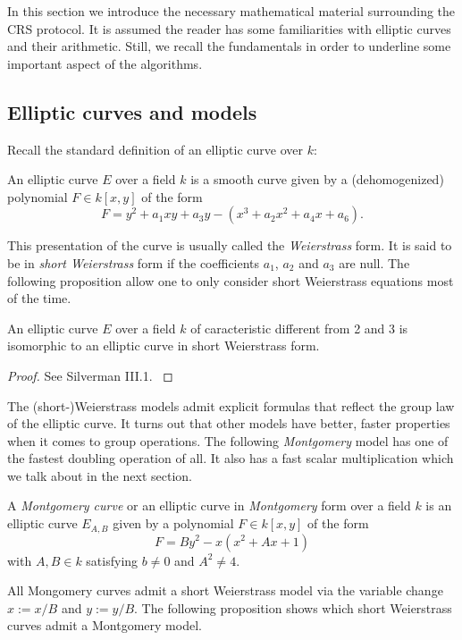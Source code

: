\documentclass[../main/main.tex]{subfiles}
\begin{document}
In this section we introduce the necessary mathematical material surrounding the CRS protocol.
It is assumed the reader has some familiarities with elliptic curves and their arithmetic.
Still, we recall the fundamentals in order to underline some important aspect of the algorithms.


\subsection{Elliptic curves and models}
Recall the standard definition of an elliptic curve over $k$:
\begin{definition}
	An elliptic curve $E$ over a field $k$ is a smooth curve given by a (dehomogenized) polynomial $F\in k[x,y]$ of the form
	\[
		F = y^2 + a_1xy + a_3y - (x^3 +a_2 x^2 + a_4 x + a_6).
	\]
\end{definition}
This presentation of the curve is usually called the \textit{Weierstrass} form.
It is said to be in \textit{short Weierstrass} form if the coefficients $a_1$, $a_2$ and $a_3$ are null.
The following proposition allow one to only consider short Weierstrass equations most of the time.
\begin{proposition}
	An elliptic curve $E$ over a field $k$ of caracteristic different from 2 and 3 is isomorphic to an elliptic curve in short Weierstrass form.
\end{proposition}
\begin{proof}
	See Silverman III.1. \cite{}
\end{proof}
The (short-)Weierstrass models admit explicit formulas that reflect the group law of the elliptic curve.
It turns out that other models have better, faster properties when it comes to group operations.
The following \textit{Montgomery} model has one of the fastest doubling operation of all.
It also has a fast scalar multiplication which we talk about in the next section.
\begin{definition}
	A \textit{Montgomery curve} or an elliptic curve in \textit{Montgomery} form over a field $k$ is an elliptic curve $E_{A, B}$ given by a polynomial $F\in k[x, y]$ of the form
	\[
		F = By^2 - x(x^2+Ax + 1)
	\]
	with $A, B\in k$ satisfying $b\neq 0$ and $A^2\neq 4$.
\end{definition}
All Mongomery curves admit a short Weierstrass model via the variable change $x := x/B$ and $y := y/B$.
The following proposition shows which short Weierstrass curves admit a Montgomery model.
\end{document}
